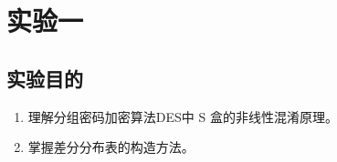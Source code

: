 \section{实验一}

\subsection{实验目的}
\begin{enumerate}
    \item 理解分组密码加密算法DES中 S 盒的非线性混淆原理。
    \item 掌握差分分布表的构造方法。
\end{enumerate}